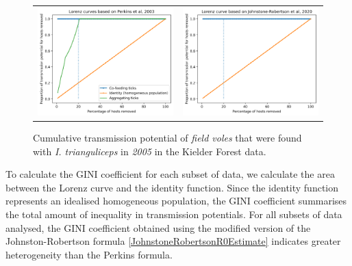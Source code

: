 \documentclass{article}
\begin{document}
\begin{figure}[h!]
	\centering
	\begin{tabular}{ll}
		\includegraphics[width=.48\linewidth,valign=m]{lorenz_perkins_FV_2005_I.Trianguliceps} & \includegraphics[width=.48\linewidth,valign=m]{lorenz_JR_FV_2005_I.Trianguliceps} \\
	\end{tabular}
	\caption{Cumulative transmission potential of \textit{field voles} that were found with \textit{I. trianguliceps} in \textit{2005} in the Kielder Forest data.}
	\label{fig:lorenz_2005_itrianguliceps_FV}
\end{figure}

To calculate the GINI coefficient for each subset of data, we calculate the area between the Lorenz curve and the identity function. Since the identity function represents an idealised homogeneous population, the GINI coefficient summarises the total amount of inequality in transmission potentials. For all subsets of data analysed, the GINI coefficient obtained using the modified version of the Johnston-Robertson formula \eqref{JohnstoneRobertsonR0Estimate} indicates greater heterogeneity than the Perkins formula. 
\end{document}
